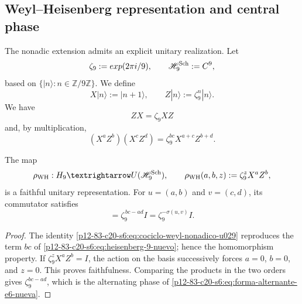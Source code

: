 \subsection{Weyl--Heisenberg representation and central phase}

The nonadic extension admits an explicit unitary realization. Let
\[
 \zeta_9:=\exp(2\pi i/9),
 \qquad
 \mathscr H_9^{\rm Sch}:=\mathbb C^9,
\]
based on \(\{|n\rangle:n\in\mathbb Z/9\mathbb Z\}\). We define
\begin{equation}
 X|n\rangle:=|n+1\rangle,
 \qquad
 Z|n\rangle:=\zeta_9^n|n\rangle.
 \label{p12-83-c20-s6:eq:weyl-desplazamiento-fase-u029}
\end{equation}
We have
\[
 ZX=\zeta_9XZ
\]
and, by multiplication,
\begin{equation}
 (X^aZ^b)(X^cZ^d)
 =\zeta_9^{bc}X^{a+c}Z^{b+d}.
 \label{p12-83-c20-s6:eq:cociclo-weyl-nonadico-u029}
\end{equation}

\begin{theorem}
\label{p12-83-c20-s6:thm:representacion-weyl-heisenberg-u029}
The map
\begin{equation}
 \rho_{\rm WH}:\mathcal H_9\longrightarrow
 U(\mathscr H_9^{\rm Sch}),
 \qquad
 \rho_{\rm WH}(a,b,z):=\zeta_9^zX^aZ^b,
 \label{p12-83-c20-s6:eq:representacion-weyl-heisenberg-u029}
\end{equation}
is a faithful unitary representation. For
\(u=(a,b)\) and \(v=(c,d)\), its commutator satisfies
\begin{equation}
 [\rho_{\rm WH}(u,0),\rho_{\rm WH}(v,0)]
 =\zeta_9^{\,bc-ad}I
 =\zeta_9^{-\sigma(u,v)}I.
 \label{p12-83-c20-s6:eq:conmutador-weyl-holonomia-u029}
\end{equation}
\end{theorem}

\begin{proof}
The identity \eqref{p12-83-c20-s6:eq:cociclo-weyl-nonadico-u029} reproduces the term
\(bc\) of \eqref{p12-83-c20-s6:eq:heisenberg-9-nuevo}; hence the
homomorphism property. If \(\zeta_9^zX^aZ^b=I\), the action on the basis successively forces
\(a=0\), \(b=0\), and \(z=0\). This proves faithfulness. Comparing
the products in the two orders gives
\(\zeta_9^{bc-ad}\), which is the alternating phase of
\eqref{p12-83-c20-s6:eq:forma-alternante-e6-nueva}.
\end{proof}


